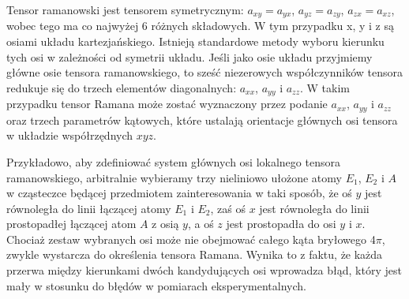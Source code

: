 Tensor ramanowski jest tensorem symetrycznym: $a_{xy} = a_{yx}$, $a_{yz} = a_{zy}$, $a_{zx} = a_{xz}$, wobec tego ma co najwyżej 6 różnych składowych. W tym przypadku x, y i z są osiami układu kartezjańskiego. Istnieją standardowe metody wyboru kierunku tych osi w zależności od symetrii układu. Jeśli jako osie układu przyjmiemy główne osie tensora ramanowskiego, to sześć niezerowych współczynników tensora redukuje się do trzech elementów diagonalnych: $a_{xx}$, $a_{yy}$ i $a_{zz}$. W takim przypadku tensor Ramana może zostać wyznaczony przez podanie $a_{xx}$, $a_{yy}$ i $a_{zz}$ oraz trzech parametrów kątowych, które ustalają orientacje głównych osi tensora w układzie współrzędnych $xyz$.

Przykładowo, aby zdefiniować system głównych osi lokalnego tensora ramanowskiego, arbitralnie wybieramy trzy nieliniowo ułożone atomy $E_1$, $E_2$ i $A$ w cząsteczce będącej przedmiotem zainteresowania w taki sposób, że oś $y$ jest równoległa do linii łączącej atomy $E_1$ i $E_2$, zaś oś $x$ jest równoległa do linii prostopadłej łączącej atom $A$ z osią $y$, a oś $z$ jest prostopadła do osi $y$ i $x$. Chociaż zestaw wybranych osi może nie obejmować całego kąta bryłowego 4$\pi$, zwykle wystarcza do określenia tensora Ramana. Wynika to z faktu, że każda przerwa między kierunkami dwóch kandydujących osi wprowadza błąd, który jest mały w stosunku do błędów w pomiarach eksperymentalnych.
